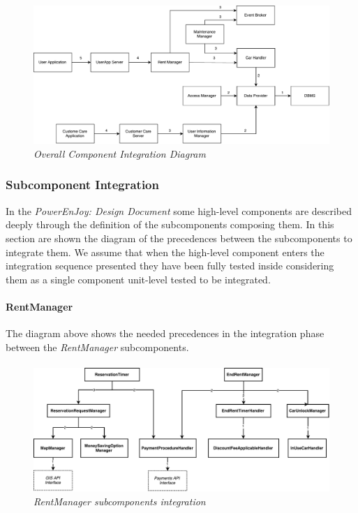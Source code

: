 	\begin{figure}[h]
			\centering
			\includegraphics[width=\linewidth]{img/overallIntegration}
			\caption{
				\label{fig:overallIntegration} 
				\emph{Overall Component Integration Diagram}
			}
	\end{figure}
	
\clearpage
\subsubsection{Subcomponent Integration}
In the \emph{PowerEnJoy: Design Document}\cite{DD} some high-level components are described deeply through the definition of the subcomponents composing them.
In this section are shown the diagram of the precedences between the subcomponents to integrate them. We assume that when the high-level component enters the integration sequence presented they have been fully tested inside considering them as a single component unit-level tested to be integrated.

\paragraph{RentManager} 
The diagram above shows the needed precedences in the integration phase between the \emph{RentManager} subcomponents.
\paragraph{}

		\begin{figure}[h]
			\centering
			\includegraphics[width=\linewidth]{img/rentManagerIntegration}
			\caption{
				\label{fig:rentManagerIntegration} 
				\emph{RentManager subcomponents integration}
			}
		\end{figure}
		
